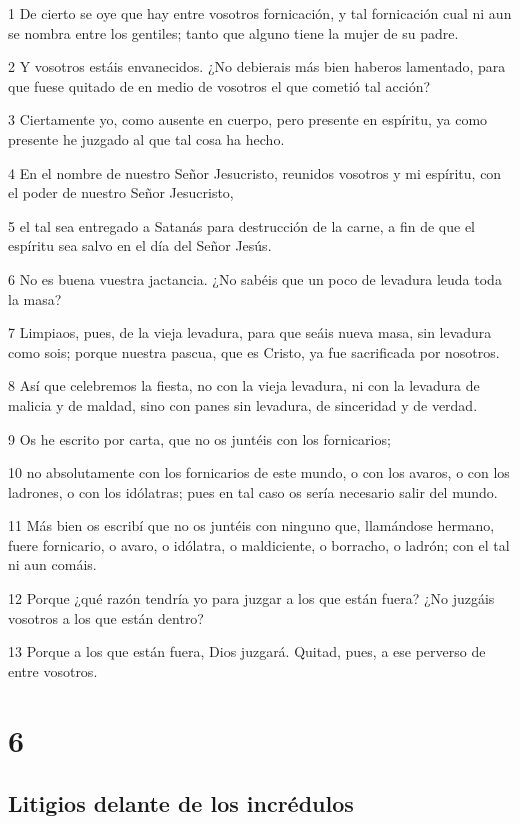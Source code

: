 \par 1 De cierto se oye que hay entre vosotros fornicación, y tal fornicación cual ni aun se nombra entre los gentiles; tanto que alguno tiene la mujer de su padre.
\par 2 Y vosotros estáis envanecidos. ¿No debierais más bien haberos lamentado, para que fuese quitado de en medio de vosotros el que cometió tal acción?
\par 3 Ciertamente yo, como ausente en cuerpo, pero presente en espíritu, ya como presente he juzgado al que tal cosa ha hecho.
\par 4 En el nombre de nuestro Señor Jesucristo, reunidos vosotros y mi espíritu, con el poder de nuestro Señor Jesucristo,
\par 5 el tal sea entregado a Satanás para destrucción de la carne, a fin de que el espíritu sea salvo en el día del Señor Jesús.
\par 6 No es buena vuestra jactancia. ¿No sabéis que un poco de levadura leuda toda la masa?
\par 7 Limpiaos, pues, de la vieja levadura, para que seáis nueva masa, sin levadura como sois; porque nuestra pascua, que es Cristo, ya fue sacrificada por nosotros.
\par 8 Así que celebremos la fiesta, no con la vieja levadura, ni con la levadura de malicia y de maldad, sino con panes sin levadura, de sinceridad y de verdad.
\par 9 Os he escrito por carta, que no os juntéis con los fornicarios;
\par 10 no absolutamente con los fornicarios de este mundo, o con los avaros, o con los ladrones, o con los idólatras; pues en tal caso os sería necesario salir del mundo.
\par 11 Más bien os escribí que no os juntéis con ninguno que, llamándose hermano, fuere fornicario, o avaro, o idólatra, o maldiciente, o borracho, o ladrón; con el tal ni aun comáis.
\par 12 Porque ¿qué razón tendría yo para juzgar a los que están fuera? ¿No juzgáis vosotros a los que están dentro?
\par 13 Porque a los que están fuera, Dios juzgará. Quitad, pues, a ese perverso de entre vosotros.

\chapter{6}

\section*{Litigios delante de los incrédulos}

